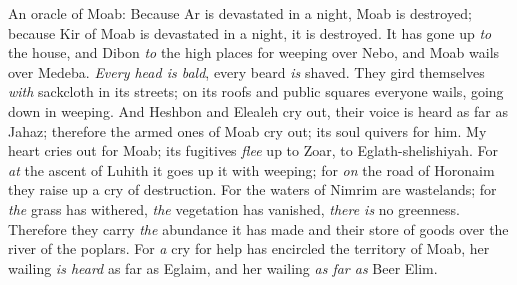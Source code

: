\begin{biblechapter} %
 An oracle of Moab:
\verse Because Ar is devastated in a night, Moab is destroyed; 
because Kir of Moab is devastated in a night, it is destroyed.
\verse It has gone up \textit{to} the house, 
and Dibon \textit{to} the high places 
for weeping over Nebo, 
and Moab wails over Medeba. 
\textit{Every head is bald}, 
every beard \textit{is} shaved.
\verse They gird themselves \textit{with} sackcloth in its streets; 
on its roofs and public squares everyone wails, 
going down in weeping.
\verse And Heshbon and Elealeh cry out, 
their voice is heard as far as Jahaz; 
therefore the armed ones of Moab cry out; 
its soul quivers for him.
\verse My heart cries out for Moab; 
its fugitives \textit{flee} up to Zoar, 
to Eglath-shelishiyah. 
For \textit{at} the ascent of Luhith it goes up it with weeping; 
for \textit{on} the road of Horonaim they raise up a cry of destruction.
\verse For the waters of Nimrim are wastelands; 
for \textit{the} grass has withered, 
\textit{the} vegetation has vanished, 
\textit{there is} no greenness.
\verse Therefore they carry \textit{the} abundance it has made 
and their store of goods over the river of the poplars.
\verse For \textit{a} cry for help has encircled the territory of Moab, 
her wailing \textit{is heard} as far as Eglaim, 
and her wailing \textit{as far as} Beer Elim.
\end{biblechapter}

